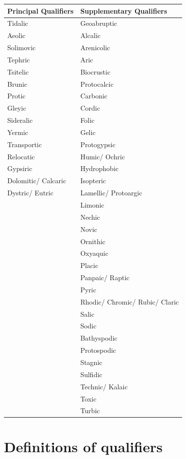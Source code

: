 \documentclass[
  letterpaper,
  DIV=11,
  numbers=noendperiod]{scrreprt}
\begin{document}
\begin{longtable}[]{@{}ll@{}}
\toprule()
Principal Qualifiers & Supplementary Qualifiers \\
\midrule()
\endhead
Tidalic & Geoabruptic \\
Aeolic & Alcalic \\
Solimovic & Arenicolic \\
Tephric & Aric \\
Tsitelic & Biocrustic \\
Brunic & Protocalcic \\
Protic & Carbonic \\
Gleyic & Cordic \\
Sideralic & Folic \\
Yermic & Gelic \\
Transportic & Protogypsic \\
Relocatic & Humic/ Ochric \\
Gypsiric & Hydrophobic \\
Dolomitic/ Calcaric & Isopteric \\
Dystric/ Eutric & Lamellic/ Protoargic \\
& Limonic \\
& Nechic \\
& Novic \\
& Ornithic \\
& Oxyaquic \\
& Placic \\
& Panpaic/ Raptic \\
& Pyric \\
& Rhodic/ Chromic/ Rubic/ Claric \\
& Salic \\
& Sodic \\
& Bathyspodic \\
& Protospodic \\
& Stagnic \\
& Sulfidic \\
& Technic/ Kalaic \\
& Toxic \\
& Turbic \\
\bottomrule()
\end{longtable}


\hypertarget{definitions-of-qualifiers}{%
\chapter{Definitions of qualifiers}\label{definitions-of-qualifiers}}
\end{document}
